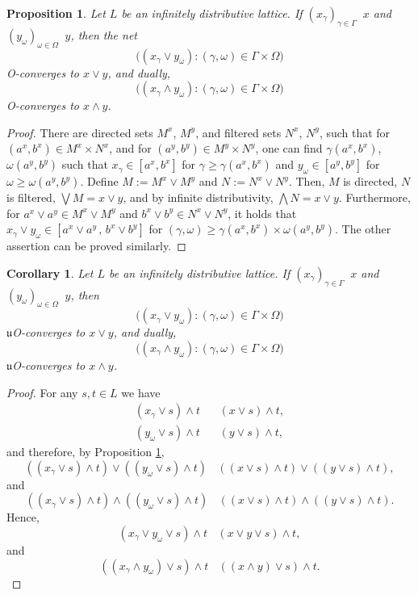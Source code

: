 \documentclass[12pt,a4paper]{amsart}
\numberwithin{equation}{section}
\newtheorem{cor}[thm]{Corollary}
\newtheorem{prop}[thm]{Proposition}
\theoremstyle{definition}
\newcommand{\converges}[1]{\mathop{\overset{\text{#1}}{\longrightarrow}}}
\begin{document}
\begin{prop}\label{3}
	Let $L$ be an infinitely distributive lattice.  If $(x_{\gamma})_{\gamma \in \Gamma}  \converges{O} x$ and  $(y_{\omega})_{\omega \in \Omega} \converges{O} y$, then the net 
	\[\bigl((x_{\gamma} \vee y_{\omega}):(\gamma , \omega) \in \Gamma \times \Omega\bigr)\]
	O-converges to $x \vee y$, and dually,
	\[\bigl((x_{\gamma} \wedge y_{\omega}):(\gamma , \omega) \in \Gamma \times \Omega\bigr)\]
	O-converges to $x \wedge y$.
\end{prop}
\begin{proof}
	There are directed sets $M^{x}$, $M^{y}$, and filtered sets $N^{x}$, $N^{y}$, such that for $(a^{x},b^{x}) \in M^{x} \times N^{x}$, and for $(a^{y},b^{y}) \in M^{y} \times N^{y}$, one can find $\gamma(a^{x},b^{x})$, $\omega(a^{y},b^{y}) $ such that $x_{\gamma} \in [a^{x},b^{x}]$ for $\gamma \geq \gamma(a^{x},b^{x})$ and $y_{\omega} \in [a^{y},b^{y}]$ for $\omega \geq \omega(a^{y},b^{y})$. Define $M:= M^{x} \vee M^{y}$ and $N:= N^{x} \vee N^{y}$. Then, $M$ is directed, $N$ is filtered, $\bigvee M = x \vee y$, and by infinite distributivity,  $\bigwedge N= x\vee y$. Furthermore, for $a^{x} \vee a^{y} \in M^{x} \vee M^{y}$ and $b^{x} \vee b^{y} \in N^{x} \vee N^{y}$, it holds that $x_{\gamma} \vee y_{\omega} \in [a^{x} \vee a^{y}\,,\, b^{x} \vee b^{y}]$ for $(\gamma, \omega) \geq \gamma(a^{x},b^{x}) \times \omega(a^{y},b^{y})$.  The other assertion can be proved similarly.  
\end{proof}



\begin{cor}\label{3.1}
	Let $L$ be an infinitely distributive lattice.  If $(x_{\gamma})_{\gamma \in \Gamma}\converges{{$\mathfrak{u}$O}} x$ and  $(y_{\omega})_{\omega \in \Omega} \converges{{$\mathfrak{u}$O}} y$, then 
	\[\bigl((x_{\gamma} \vee y_{\omega}):(\gamma , \omega) \in \Gamma \times \Omega\bigr)\]
	$\mathfrak u$O-converges to $x \vee y$, and dually,
	\[\bigl((x_{\gamma} \wedge y_{\omega}):(\gamma , \omega) \in \Gamma \times \Omega\bigr)\]
	$\mathfrak u$O-converges to $x \wedge y$.
\end{cor}
\begin{proof}
	For any $s,t\in L$ we have
 \begin{align*}
     (x_\gamma\vee s)\wedge t\,&\converges{O}\,(x\vee s)\wedge t,\\ 
     (y_\omega\vee s)\wedge t\,&\converges{O}\,(y\vee s)\wedge t,
     \end{align*}
and therefore, by Proposition \ref{3}, 
\[((x_\gamma\vee s)\wedge t)\vee((y_\omega\vee s)\wedge t)\,\converges{O}\,((x\vee s)\wedge t)\vee((y\vee s)\wedge t),\]
and
\[((x_\gamma\vee s)\wedge t)\wedge((y_\omega\vee s)\wedge t)\,\converges{O}\,((x\vee s)\wedge t)\wedge((y\vee s)\wedge t).\]
Hence,
\[(x_\gamma\vee y_\omega\vee s)\wedge t\,\converges{O}\,(x\vee y\vee s)\wedge t,\]
and
\[((x_\gamma\wedge y_\omega)\vee s)\wedge t\,\converges{O}\,((x\wedge y)\vee s)\wedge t.\]
\end{proof}	
\end{document}
